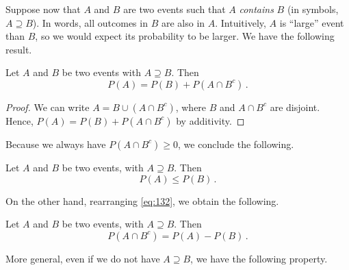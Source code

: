 Suppose now that $A$ and $B$ are two events such that $A$ \emph{contains} $B$ (in symbols, $A \supseteq B$).
In words, all outcomes in $B$ are also in $A$. Intuitively, $A$ is ``large'' event than $B$, so we would expect its
probability to be larger.
We have the following result.
\begin{theorem}
    Let $A$ and $B$ be two events with $A \supseteq B$. Then
    \begin{equation}
        \label{eq:132}
        P(A) = P(B)+P(A \cap B^c)\,.
    \end{equation}
\end{theorem}
\begin{proof}
    We can write $A=B\cup (A \cap B^c)$, where $B$ and $A \cap B^c$ are disjoint. Hence, $P(A)=P(B)+P(A\cap B^c)$ by
    additivity.
\end{proof}
Because we always have $P(A \cap B^c)\geqslant 0$, we conclude the following.
\begin{corollary}
    Let $A$ and $B$ be two events, with $ A \supseteq B$. Then
    $$
    P(A) \leqslant P(B)\,.
    $$
\end{corollary}
On the other hand, rearranging \autoref{eq:132}, we obtain the following.
\begin{corollary}\label{cor:132}
    Let $A$ and $B$ be two events, with $A \supseteq B$. Then
    \begin{equation}
        P(A \cap B^c) = P(A) - P(B)\,.
    \end{equation}
\end{corollary}

More general, even if we do not have $A \supseteq B$, we have the following property.

